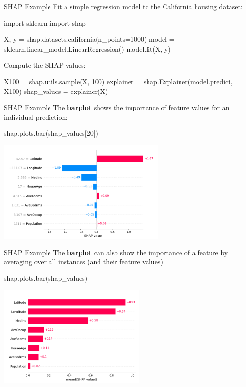 \documentclass[ignorenonframetext,xcolor=x11names]{beamer}
\begin{document}
\begin{frame}[fragile]{SHAP Example}
Fit a simple regression model to the California housing dataset:
\begin{pythoncode}
import sklearn
import shap

X, y = shap.datasets.california(n_points=1000)
model = sklearn.linear_model.LinearRegression()
model.fit(X, y)
\end{pythoncode}
Compute the SHAP values:
\begin{pythoncode}
X100 = shap.utils.sample(X, 100)
explainer = shap.Explainer(model.predict, X100)
shap_values = explainer(X)
\end{pythoncode}
\end{frame}

\begin{frame}[fragile]{SHAP Example}
The \textbf{barplot} shows the importance of feature values for an individual prediction:
\begin{pythoncode}
shap.plots.bar(shap_values[20])
\end{pythoncode}
\begin{center}
\includegraphics[height=2in]{shap_barplot1.png}
\end{center}
\end{frame}

\begin{frame}[fragile]{SHAP Example}
The \textbf{barplot} can also show the importance of a feature by averaging over all instances (and their feature values):
\begin{pythoncode}
shap.plots.bar(shap_values)
\end{pythoncode}
\begin{center}
\includegraphics[height=2in]{shap_barplot2.png}
\end{center}
\end{frame}
\end{document}
